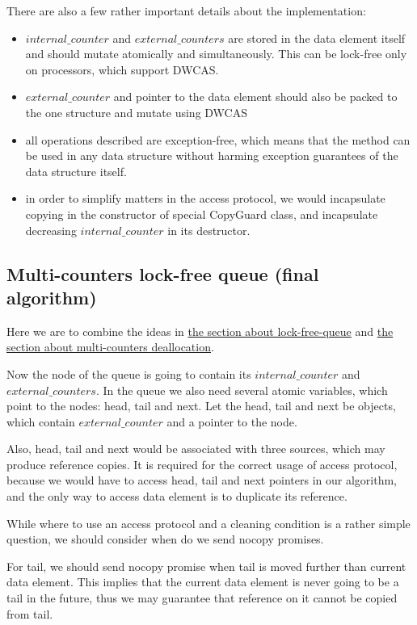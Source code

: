\documentclass{article}
\begin{document}
There are also a few rather important details about the implementation:
\begin{itemize}
	\item $internal\_counter$ and $external\_counters$ are stored in the data element itself and should mutate atomically and simultaneously. This can be lock-free only on processors, which support DWCAS.
	\item $external\_counter$ and pointer to the data element should also be packed to the one structure and mutate using DWCAS
	\item all operations described are exception-free, which means that the method can be used in any data structure without harming exception guarantees of the data structure itself.
	\item in order to simplify matters in the access protocol, we would incapsulate copying in the constructor of special CopyGuard class, and incapsulate decreasing $internal\_counter$ in its destructor.
\end{itemize}

\subsection{Multi-counters lock-free queue (final algorithm)}
\label{subsec:dealloc_lock_free_queue}

Here we are to combine the ideas in \hyperref[subsec:lock_free_queue]{the section about lock-free-queue} and \hyperref[subsec:three_counters] {the section about multi-counters deallocation}.

Now the node of the queue is going to contain its $internal\_counter$ and $external\_counters$. In the queue we also need several atomic variables, which point to the nodes: head, tail and next. Let the head, tail and next be objects, which contain $external\_counter$ and a pointer to the node.

Also, head, tail and next would be associated with three sources, which may produce reference copies. It is required for the correct usage of access protocol, because we would have to access head, tail and next pointers in our algorithm, and the only way to access data element is to duplicate its reference.

While where to use an access protocol and a cleaning condition is a rather simple question, we should consider when do we send nocopy promises.

For tail, we should send nocopy promise when tail is moved further than current data element. This implies that the current data element is never going to be a tail in the future, thus we may guarantee that reference on it cannot be copied from tail.
\end{document}
